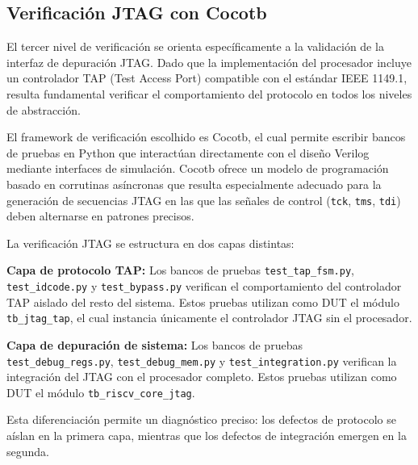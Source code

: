\subsection{Verificación JTAG con Cocotb}
\label{sec:CocotbJTAG}

El tercer nivel de verificación se orienta específicamente a la validación de la interfaz de depuración JTAG. Dado que la implementación del procesador incluye un controlador TAP (Test Access Port) compatible con el estándar IEEE 1149.1, resulta fundamental verificar el comportamiento del protocolo en todos los niveles de abstracción.

El framework de verificación escolhido es Cocotb, el cual permite escribir bancos de pruebas en Python que interactúan directamente con el diseño Verilog mediante interfaces de simulación. Cocotb ofrece un modelo de programación basado en corrutinas asíncronas que resulta especialmente adecuado para la generación de secuencias JTAG en las que las señales de control (\texttt{tck}, \texttt{tms}, \texttt{tdi}) deben alternarse en patrones precisos.

La verificación JTAG se estructura en dos capas distintas:

\textbf{Capa de protocolo TAP:} Los bancos de pruebas \texttt{test\_tap\_fsm.py}, \texttt{test\_idcode.py} y \texttt{test\_bypass.py} verifican el comportamiento del controlador TAP aislado del resto del sistema. Estos pruebas utilizan como DUT el módulo \texttt{tb\_jtag\_tap}, el cual instancia únicamente el controlador JTAG sin el procesador.

\textbf{Capa de depuración de sistema:} Los bancos de pruebas \texttt{test\_debug\_regs.py}, \texttt{test\_debug\_mem.py} y \texttt{test\_integration.py} verifican la integración del JTAG con el procesador completo. Estos pruebas utilizan como DUT el módulo \texttt{tb\_riscv\_core\_jtag}.

Esta diferenciación permite un diagnóstico preciso: los defectos de protocolo se aíslan en la primera capa, mientras que los defectos de integración emergen en la segunda.

